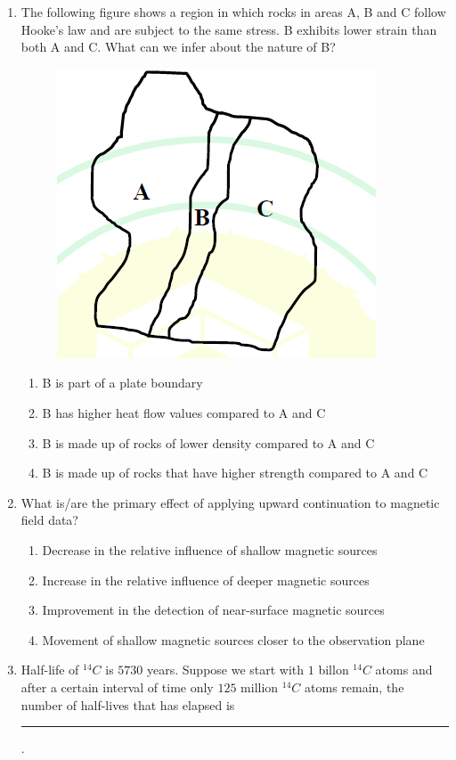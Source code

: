 \documentclass[journal,12pt,onecolumn]{IEEEtran}
\theoremstyle{remark}
\begin{document}
\begin{enumerate}
\item The following figure shows a region in which rocks in areas A, B and C follow Hooke's law and are subject to the same stress. B exhibits lower strain than both A and C. What can we infer about the nature of B?
\begin{figure}[H]
    \centering
    \includegraphics[width=0.5\columnwidth]{figs/fig8.png}
    \caption{}
    \label{fig:q40}
\end{figure}
\hfill{}
\begin{enumerate}
    \item B is part of a plate boundary
    \item B has higher heat flow values compared to A and C
    \item B is made up of rocks of lower density compared to A and C
    \item B is made up of rocks that have higher strength compared to A and C
\end{enumerate}

\item What is/are the primary effect of applying upward continuation to magnetic field data? \hfill{}
\begin{enumerate}
    \item Decrease in the relative influence of shallow magnetic sources
    \item Increase in the relative influence of deeper magnetic sources
    \item Improvement in the detection of near-surface magnetic sources
    \item Movement of shallow magnetic sources closer to the observation plane
\end{enumerate}

\item Half-life of $^{14}C$ is $5730$ years. Suppose we start with $1$ billon $^{14}C$ atoms and after a certain interval of time only $125$ million $^{14}C$ atoms remain, the number of half-lives that has elapsed is \rule{3cm}{0.15mm}.  \hfill{}


\end{enumerate}
\end{document}
